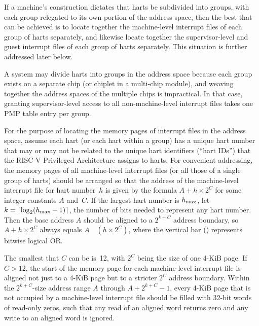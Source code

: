 If a machine's construction dictates that harts be subdivided into
groups, with each group relegated to its own portion of the address
space, then the best that can be achieved is to locate together the
machine-level interrupt files of each group of harts separately, and
likewise locate together the supervisor-level and guest interrupt files
of each group of harts separately.
This situation is further addressed later below.

\begin{commentary}
A system may divide harts into groups in the address space because each
group exists on a separate chip (or chiplet in a multi-chip module),
and weaving together the address spaces of the multiple chips is
impractical.
In that case, granting supervisor-level access to all non-machine-level
interrupt files takes one PMP table entry per group.
\end{commentary}

For the purpose of locating the memory pages of interrupt files in the
address space, assume each hart (or each hart within a group) has a
unique hart number that may or may not be related to the unique hart
identifiers (``hart IDs'') that the RISC-V Privileged Architecture
assigns to harts.
For convenient addressing, the memory pages of all machine-level
interrupt files (or all those of a single group of harts) should be
arranged so that the address of the machine-level interrupt file for
hart number~$h$ is given by the formula ${A+h\times\mbox{2}^{C}}$ for
some integer constants $A$ and~$C$.
If the largest hart number is $h_{\rm max}$, let
${k = \lceil\log_{2}(h_{\rm max}+\mbox{1})\rceil}$, the number of bits
needed to represent any hart number.
Then the base address $A$ should be aligned to a $\mbox{2}^{k+C}$
address boundary, so ${A+h\times\mbox{2}^{C}}$ always equals
$A$~\z{|}~${(h\times\mbox{2}^{C})}$, where the vertical bar (\z{|})
represents bitwise logical OR.

The smallest that $C$ can be is~12, with $\mbox{2}^{C}$ being the size
of one \mbox{4-KiB} page.
If ${C > 12}$, the start of the memory page for each machine-level
interrupt file is aligned not just to a \mbox{4-KiB} page but to a
stricter $\mbox{2}^{C}$ address boundary.
Within the ${\mbox{2}^{k+C}}$-size address range $A$ through
${A+\mbox{2}^{k+C}-\mbox{1}}$, every \mbox{4-KiB} page that is not
occupied by a machine-level interrupt file should be filled with
\mbox{32-bit} words of read-only zeros, such that any read of an
aligned word returns zero and any write to an aligned word is ignored.

